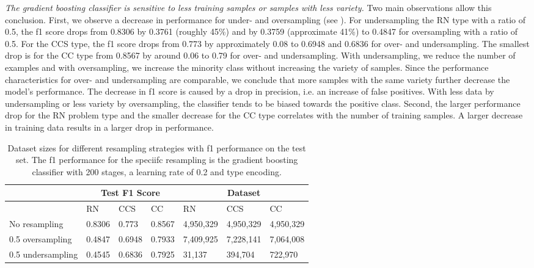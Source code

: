\textit{The gradient boosting classifier is sensitive to less training samples or samples with less variety.} Two main observations allow this conclusion. First, we observe a decrease in performance for under- and oversampling (see  ). For undersampling the RN type with a ratio of 0.5, the f1 score drops from 0.8306 by 0.3761 (roughly 45\%) and by 0.3759 (approximate 41\%) to 0.4847 for oversampling with a ratio of 0.5. For the CCS type, the f1 score drops from 0.773 by approximately 0.08 to 0.6948 and 0.6836 for over- and undersampling. The smallest drop is for the CC type from 0.8567 by around 0.06 to 0.79 for over- and undersampling. With undersampling, we reduce the number of examples and with oversampling, we increase the minority class without increasing the variety of samples. Since the performance characteristics for over- and undersampling are comparable, we conclude that more samples with the same variety further decrease the model's performance. The decrease in f1 score is caused by a drop in precision, i.e. an increase of false positives. With less data by undersampling or less variety by oversampling, the classifier tends to be biased towards the positive class.
Second, the larger performance drop for the RN problem type and the smaller decrease for the CC type correlates with the number of training samples. A larger decrease in training data results in a larger drop in performance. 

\begin{table}[]
    \tabcolsep=0.11cm
    \begin{tabularx}{\textwidth}{lXXX|XXX}
    \toprule
                        & \multicolumn{3}{c}{Test F1 Score} & \multicolumn{3}{c}{Dataset}   \\ \midrule
                        & RN        & CCS        & CC     & RN            & CCS         & CC          \\ \midrule
    No resampling     &  0.8306   &  0.773    &  0.8567  &  4,950,329    & 4,950,329   & 4,950,329   \\
    0.5 oversampling  &  0.4847   &  0.6948   &  0.7933  &  7,409,925    & 7,228,141   & 7,064,008   \\
    0.5 undersampling &  0.4545   &  0.6836   &  0.7925  &  31,137       & 394,704     & 722,970     \\ \bottomrule
    \end{tabularx}
    \caption{Dataset sizes for different resampling strategies with f1 performance on the test set. The f1 performance for the speciifc resampling is the gradient boosting classifier with 200 stages, a learning rate of 0.2 and type encoding.}
    \label{tab:resampling_size_performance_gbc}
    \end{table}

